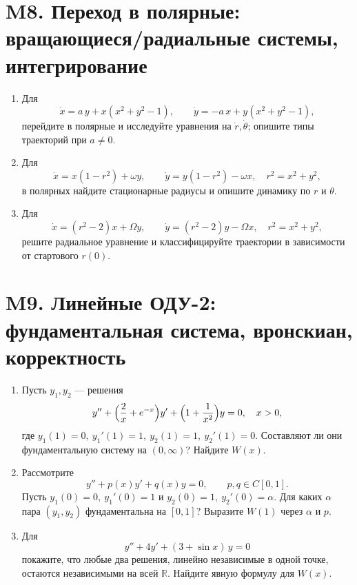 \documentclass[12pt]{article}
\begin{document}
\section*{M8. Переход в полярные: вращающиеся/радиальные системы, интегрирование}
\begin{enumerate}
\item Для
\[
\dot x = a\,y + x(x^2+y^2-1),\qquad
\dot y = -a\,x + y(x^2+y^2-1),
\]
перейдите в полярные и исследуйте уравнения на $\dot r,\dot\theta$; опишите типы траекторий при $a\ne0$.

\item Для
\[
\dot x = x(1-r^2)+\omega y,\qquad
\dot y = y(1-r^2)-\omega x,\quad r^2=x^2+y^2,
\]
в полярных найдите стационарные радиусы и опишите динамику по $r$ и $\theta$.

\item Для
\[
\dot x = (r^2-2)x + \Omega y,\qquad
\dot y = (r^2-2)y - \Omega x,\quad r^2=x^2+y^2,
\]
решите радиальное уравнение и классифицируйте траектории в зависимости от стартового $r(0)$.
\end{enumerate}

\section*{M9. Линейные ОДУ-2: фундаментальная система, вронскиан, корректность}
\begin{enumerate}
\item Пусть $y_1,y_2$ --- решения
\[
y''+\Bigl(\frac{2}{x}+e^{-x}\Bigr)y' + \Bigl(1+\frac{1}{x^2}\Bigr)y=0,\quad x>0,
\]
где $y_1(1)=0,\ y_1'(1)=1,\ y_2(1)=1,\ y_2'(1)=0$. Составляют ли они фундаментальную систему на $(0,\infty)$? Найдите $W(x)$.

\item Рассмотрите
\[
y''+p(x)y'+q(x)y=0,\qquad p,q\in C[0,1].
\]
Пусть $y_1(0)=0,\ y_1'(0)=1$ и $y_2(0)=1,\ y_2'(0)=\alpha$. Для каких $\alpha$ пара $(y_1,y_2)$ фундаментальна на $[0,1]$? Выразите $W(1)$ через $\alpha$ и $p$.

\item Для
\[
y''+4y'+(3+\sin x)\,y=0
\]
покажите, что любые два решения, линейно независимые в одной точке, остаются независимыми на всей $\mathbb{R}$. Найдите явную формулу для $W(x)$.
\end{enumerate}

\end{document}
